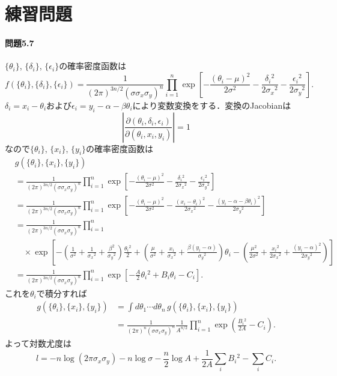 \section*{練習問題}
\paragraph{問題5.7}
\(\{\theta_i\}\), \(\{\delta_i\}\), \(\{\epsilon_i\}\)の確率密度函数は
\[
f(\{\theta_i\}, \{\delta_i\}, \{\epsilon_i\})
= \frac{1}{(2\pi)^{3n/2} (\sigma \sigma_x \sigma_y)^n}
\prod_{i=1}^n \exp \left[ - \frac{(\theta_i-\mu)^2}{2\sigma^2} - \frac{\delta_i{}^2}{2\sigma_x{}^2} - \frac{\epsilon_i{}^2}{2\sigma_y{}^2} \right] .
\]
\(\delta_i = x_i - \theta_i\)および\(\epsilon_i = y_i - \alpha - \beta\theta_i\)により変数変換をする．変換のJacobianは
\[
\left\lvert \frac{\partial (\theta_i, \delta_i, \epsilon_i)}{\partial (\theta_i, x_i, y_i)} \right\rvert = 1
\]
なので\(\{\theta_i\}\), \(\{x_i\}\), \(\{y_i\}\)の確率密度函数は
\begin{align*}
  & g(\{\theta_i\}, \{x_i\}, \{y_i\}) \\
  &= \frac{1}{(2\pi)^{3n/2} (\sigma \sigma_x \sigma_y)^n}
  \prod_{i=1}^n \exp \left[ - \frac{(\theta_i-\mu)^2}{2\sigma^2} - \frac{\delta_i{}^2}{2\sigma_x{}^2} - \frac{\epsilon_i{}^2}{2\sigma_y{}^2} \right] \\
  &= \frac{1}{(2\pi)^{3n/2} (\sigma \sigma_x \sigma_y)^n}
  \prod_{i=1}^n \exp \left[
    - \frac{(\theta_i-\mu)^2}{2\sigma^2}
    - \frac{(x_i - \theta_i)^2}{2\sigma_x{}^2}
    - \frac{(y_i - \alpha - \beta\theta_i)^2}{2\sigma_y{}^2} \right] \\
  &= \frac{1}{(2\pi)^{3n/2} (\sigma \sigma_x \sigma_y)^n}
  \prod_{i=1}^n \\
  &\quad\times \exp \left[
    - \left( \frac{1}{\sigma^2} + \frac{1}{\sigma_x{}^2} + \frac{\beta^2}{\sigma_y{}^2} \right) \frac{\theta_i{}^2}{2}
    + \left( \frac{\mu}{\sigma^2} + \frac{x_i}{\sigma_x{}^2} + \frac{\beta(y_i-\alpha)}{\sigma_y{}^2} \right) \theta_i
    - \left( \frac{\mu^2}{2\sigma^2} + \frac{x_i{}^2}{2\sigma_x{}^2} + \frac{(y_i-\alpha)^2}{2\sigma_y{}^2} \right) \right] \\
  &= \frac{1}{(2\pi)^{3n/2} (\sigma \sigma_x \sigma_y)^n}
  \prod_{i=1}^n \exp \left[ - \frac{A}{2} \theta_i{}^2 + B_i \theta_i - C_i \right] .
\end{align*}
これを\(\theta_i\)で積分すれば
\begin{align*}
  g(\{\theta_i\}, \{x_i\}, \{y_i\})
  &= \int d\theta_1 \cdots d\theta_n \,  g(\{\theta_i\}, \{x_i\}, \{y_i\}) \\
  &= \frac{1}{(2\pi)^n (\sigma \sigma_x \sigma_y)^n} \frac{1}{A^{n/2}}
  \prod_{i=1}^n \exp \left( \frac{B_i{}^2}{2A} - C_i \right) .
\end{align*}
よって対数尤度は
\[
l = - n \log(2\pi\sigma_x \sigma_y) - n \log\sigma - \frac{n}{2} \log A + \frac{1}{2A} \sum_i B_i{}^2 - \sum_i C_i .
\]

